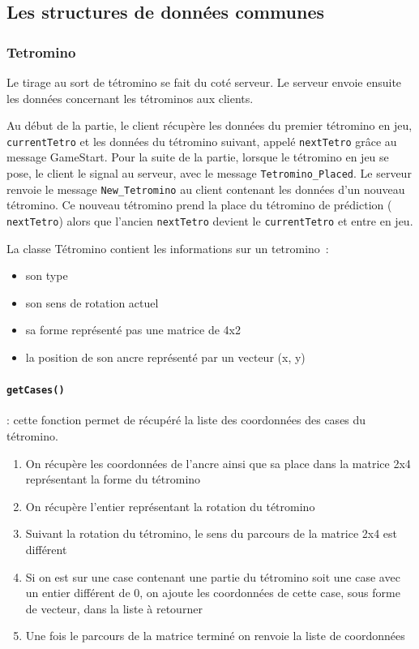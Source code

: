 \documentclass[a4paper, 12pt]{article}
\begin{document}
		\subsection{Les structures de données communes}

		\subsubsection{Tetromino}

			Le tirage au sort de tétromino se fait du coté serveur. Le serveur envoie ensuite les données concernant les tétrominos aux clients.
			
			Au début de la partie, le client récupère les données du premier tétromino en jeu, \texttt{currentTetro} et les données du tétromino suivant, appelé \texttt{nextTetro} grâce au message GameStart.
			Pour la suite de la partie, lorsque le tétromino en jeu se pose, le client le signal au serveur, avec le message \texttt{Tetromino\_Placed}. Le serveur renvoie le message \texttt{New\_Tetromino} au client contenant les données d’un nouveau tétromino. Ce nouveau tétromino prend la place du tétromino de prédiction ( \texttt{nextTetro}) alors que l’ancien \texttt{nextTetro} devient le \texttt{currentTetro} et entre en jeu.

			La classe Tétromino contient les informations sur un tetromino :
			\begin{itemize}
				\item son type
				\item son sens de rotation actuel
				\item sa forme représenté pas une matrice de 4x2
				\item la position de son ancre représenté par un vecteur (x, y)
			\end{itemize}

			\paragraph{ \texttt{getCases()}} :
			cette fonction permet de récupéré la liste des coordonnées des cases du tétromino.
			\begin{enumerate}

				\item On récupère les coordonnées de l’ancre ainsi que sa place dans la matrice 2x4 représentant la forme du tétromino
				\item On récupère l’entier représentant la rotation du tétromino
				\item Suivant la rotation du tétromino, le sens du parcours de la matrice 2x4 est différent
				\item Si on est sur une case contenant une partie du tétromino soit une case avec un entier différent de 0, on ajoute les coordonnées de cette case, sous forme de vecteur, dans la liste à retourner
				\item Une fois le parcours de la matrice terminé on renvoie la liste de coordonnées

			\end{enumerate}
\end{document}
